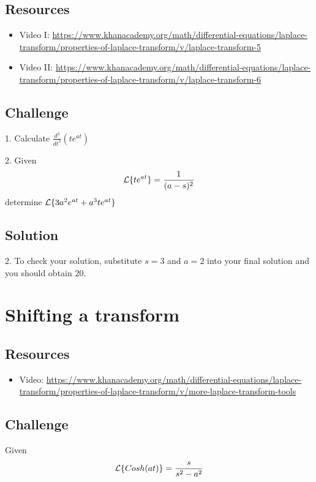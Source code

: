 \subsection*{Resources}
\begin{itemize} %
    \item Video I: \url{https://www.khanacademy.org/math/differential-equations/laplace-transform/properties-of-laplace-transform/v/laplace-transform-5} %
    \item Video II: \url{https://www.khanacademy.org/math/differential-equations/laplace-transform/properties-of-laplace-transform/v/laplace-transform-6} %
\end{itemize}

\subsection*{Challenge}
1. Calculate $\displaystyle \frac{d^3}{dt^3} \left( t e^{a t} \right)$

2. Given
\begin{equation}
    \mathcal{L}\{t e^{a t}\} = \frac{1}{(a-s)^2}
\end{equation}
determine $\mathcal{L}\{3a^2 e^{at} + a^3te^{at}\}$

\subsection*{Solution}
2. To check your solution, substitute $s=3$ and $a=2$ into your final solution and you should obtain $20$.






\newpage
\section{Shifting a transform}

\subsection*{Resources}
\begin{itemize}
    \item Video: \url{https://www.khanacademy.org/math/differential-equations/laplace-transform/properties-of-laplace-transform/v/more-laplace-transform-tools} %
\end{itemize}

\subsection*{Challenge}
Given
\begin{equation}
    \mathcal{L}\{Cosh(at)\} = \frac{s}{s^2-a^2}
\end{equation}


